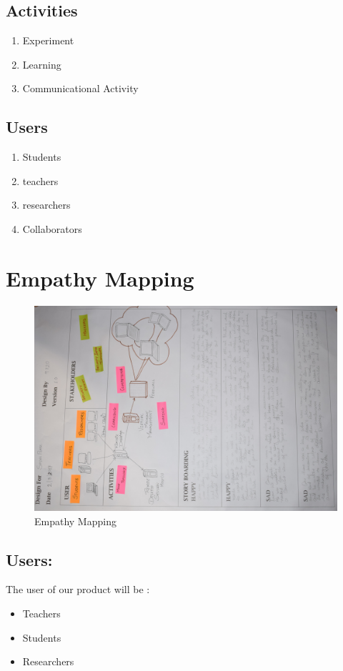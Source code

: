 \documentclass[12pt,a4paper,final,oneside]{report}
\begin{document}
\subsection{Activities}
\textbf{}
\begin{enumerate}
\item Experiment
\item Learning
\item Communicational Activity
\end{enumerate}
\subsection{Users}
\textbf{}
\begin{enumerate}
\item Students
\item teachers
\item researchers
\item Collaborators
\end{enumerate}
\newpage
	\section{Empathy Mapping} 
	\noindent\begin{figure}[h!]
		\centering
		\includegraphics[width=0.685\linewidth,angle=0]{empathy.jpg}
		\caption{Empathy Mapping }
	\end{figure}
	\subsection{Users:}
	The user of our product will be : \\
	 \begin{itemize}
	\item Teachers
   \item Students 
   \item Researchers 
\end{itemize}
\end{document}
